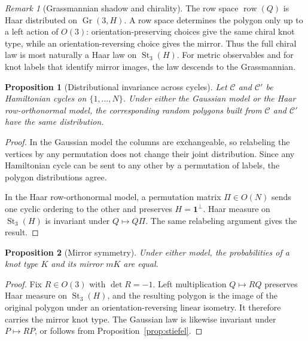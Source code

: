 \documentclass[11pt]{amsart}
\newtheorem{proposition}{Proposition}
\theoremstyle{remark}
\newtheorem{remark}{Remark}
\newcommand{\1}{\mathbf{1}}
\newcommand{\row}{\operatorname{row}}
\newcommand{\Gr}{\operatorname{Gr}}
\newcommand{\St}{\operatorname{St}}
\begin{document}
\begin{remark}[Grassmannian shadow and chirality]
The row space \(\row(Q)\) is Haar distributed on \(\Gr(3,H)\).  A row space determines the
polygon only up to a left action of \(O(3)\): orientation-preserving choices give the same
chiral knot type, while an orientation-reversing choice gives the mirror.  Thus the full
chiral law is most naturally a Haar law on \(\St_3(H)\).  For metric observables and for
knot labels that identify mirror images, the law descends to the Grassmannian.
\end{remark}

\begin{proposition}[Distributional invariance across cycles]\label{prop:cycle-invariance}
Let \(\mathcal C\) and \(\mathcal C'\) be Hamiltonian cycles on \(\{1,\dots,N\}\).  Under
either the Gaussian model or the Haar row-orthonormal model, the corresponding random
polygons built from \(\mathcal C\) and \(\mathcal C'\) have the same distribution.
\end{proposition}

\begin{proof}
In the Gaussian model the columns are exchangeable, so relabeling the vertices by any
permutation does not change their joint distribution.  Since any Hamiltonian cycle can be
sent to any other by a permutation of labels, the polygon distributions agree.

In the Haar row-orthonormal model, a permutation matrix \(\Pi\in O(N)\) sends one cyclic
ordering to the other and preserves \(H=\1^\perp\).  Haar measure on \(\St_3(H)\) is
invariant under \(Q\mapsto Q\Pi\).  The same relabeling argument gives the result.
\end{proof}

\begin{proposition}[Mirror symmetry]\label{prop:mirror}
Under either model, the probabilities of a knot type \(K\) and its mirror
\(mK\) are equal.
\end{proposition}

\begin{proof}
Fix \(R\in O(3)\) with \(\det R=-1\).  Left multiplication \(Q\mapsto RQ\)
preserves Haar measure on \(\St_3(H)\), and the resulting polygon is the image
of the original polygon under an orientation-reversing linear isometry.
It therefore carries the mirror knot type.  The Gaussian law is likewise
invariant under \(P\mapsto RP\), or follows from
Proposition~\ref{prop:stiefel}.
\end{proof}
\end{document}
